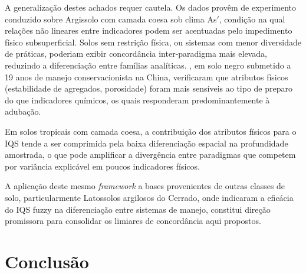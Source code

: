 \documentclass[pdflatex,sn-basic]{sn-jnl}%
\begin{document}
A generalização destes achados requer cautela. Os dados provêm de experimento conduzido sobre Argissolo com camada coesa \citep{LimaNeto2010} sob clima As$'$, condição na qual relações não lineares entre indicadores podem ser acentuadas pelo impedimento físico subsuperficial. Solos sem restrição física, ou sistemas com menor diversidade de práticas, poderiam exibir concordância inter-paradigma mais elevada, reduzindo a diferenciação entre famílias analíticas. \cite{Zhao2022}, em solo negro submetido a 19 anos de manejo conservacionista na China, verificaram que atributos físicos (estabilidade de agregados, porosidade) foram mais sensíveis ao tipo de preparo do que indicadores químicos, os quais responderam predominantemente à adubação. 

Em solos tropicais com camada coesa, a contribuição dos atributos físicos para o IQS tende a ser comprimida pela baixa diferenciação espacial na profundidade amostrada, o que pode amplificar a divergência entre paradigmas que competem por variância explicável em poucos indicadores físicos.

A aplicação deste mesmo \textit{framework} a bases provenientes de outras classes de solo, particularmente Latossolos argilosos do Cerrado, onde \cite{DosSantos2021} indicaram a eficácia do IQS fuzzy na diferenciação entre sistemas de manejo, constitui direção promissora para consolidar os limiares de concordância aqui propostos.


\section{Conclusão}\label{sec:conclusion}
\end{document}
